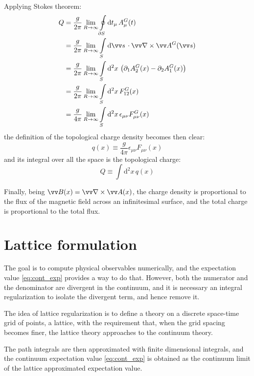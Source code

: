 Applying Stokes theorem:
\begin{align*}
    Q &= \frac{g}{2\pi}\lim_{R\to\infty}\oint\limits_{\partial S}\mathrm dt_\mu\,A^G_\mu(t) \\
      &= \frac{g}{2\pi}\lim_{R\to\infty}\int\limits_S\mathrm d\vv s\,\cdot \vv\nabla \times \vv A^G(\vv s) \\
      &= \frac{g}{2\pi}\lim_{R\to\infty}\int\limits_S\mathrm d^2x\, \left(\partial_1 A^G_2(x) - \partial_2 A^G_1(x)\right) \\
      &= \frac{g}{2\pi}\lim_{R\to\infty}\int\limits_S\mathrm d^2x\, F^G_{12}(x) \\
      &= \frac{g}{4\pi}\lim_{R\to\infty}\int\limits_S\mathrm d^2x\, \epsilon_{\mu\nu}F^G_{\mu\nu}(x)
\end{align*}
the definition of the topological charge density becomes then clear:
\begin{equation}\label{eq:top_charge_density}
    q(x) \equiv \frac{g}{4\pi}\epsilon_{\mu\nu}F_{\mu\nu}(x)
\end{equation}
and its integral over all the space is the topological charge:
\begin{equation}\label{eq:top_charge}
    Q \equiv \int\mathrm d^2x\,q(x)
\end{equation}

Finally, being $\vv B(x) = \vv\nabla \times \vv A(x)$, the charge density is proportional to the flux of the magnetic field across an infinitesimal surface,
and the total charge is proportional to the total flux.

\section{Lattice formulation}
The goal is to compute physical observables numerically, and the expectation value \eqref{eq:cont_exp} provides a way to do that.
However, both the numerator and the denominator are divergent in the continuum, and it is necessary an integral regularization to isolate the divergent term,
and hence remove it.

The idea of lattice regularization is to define a theory on a discrete space-time grid of points, \ie a lattice,
with the requirement that, when the grid spacing becomes finer,
the lattice theory approaches to the continuum theory.

The path integrals are then approximated with finite dimensional integrals,
and the continuum expectation value \eqref{eq:cont_exp} is obtained as the continuum limit of the lattice approximated expectation value.

